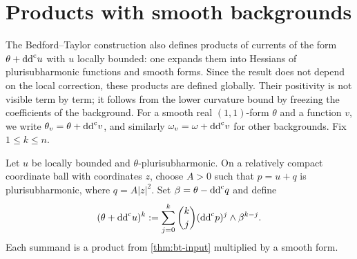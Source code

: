 \section{Products with smooth backgrounds}
\label{sec:psh-bounded-products}

The Bedford--Taylor construction also defines products of currents of the form $\theta+\mathrm{dd}^{\mathrm{c}} u$ with $u$ locally bounded: one expands them into Hessians of plurisubharmonic functions and smooth forms. Since the result does not depend on the local correction, these products are defined globally. Their positivity is not visible term by term; it follows from the lower curvature bound by freezing the coefficients of the background. For a smooth real $(1,1)$-form $\theta$ and a function $v$, we write $\theta_v=\theta+\mathrm{dd}^{\mathrm{c}} v$, and similarly $\omega_v=\omega+\mathrm{dd}^{\mathrm{c}} v$ for other backgrounds. Fix $1\leq k\leq n$.

Let $u$ be locally bounded and $\theta$-plurisubharmonic. On a relatively compact coordinate ball with coordinates $z$, choose $A>0$ such that $p=u+q$ is plurisubharmonic, where $q=A|z|^2$. Set $\beta=\theta-\mathrm{dd}^{\mathrm{c}} q$ and define
\begin{equation}\label{eq:bounded-expansion}
 (\theta+\mathrm{dd}^{\mathrm{c}} u)^k
 :=\sum_{j=0}^k\binom{k}{j}(\mathrm{dd}^{\mathrm{c}} p)^j\wedge\beta^{k-j}.
\end{equation}
Each summand is a product from \cref{thm:bt-input} multiplied by a smooth form.

